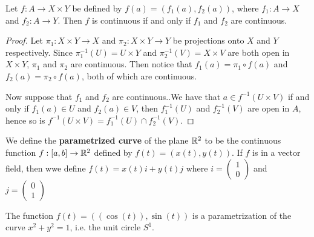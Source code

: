 \begin{theorem}\label{1.7.5}
    Let $f:A \rightarrow X \times Y$ be defined by  $f(a)=(f_1(a),f_2(a))$, where $ f_1:A
    \rightarrow X$ and $ f_2: A \rightarrow Y$. Then $f$ is continuous if and only if  $ f_1$ and $
    f_2$ are continuous.
\end{theorem}
\begin{proof}
    Let $\pi_1:X \times Y \rightarrow X$ and $\pi_2:X \times Y \rightarrow Y$ be projections onto
    $X$ and  $Y$ respectively. Since  $\pi_1^{-1}(U)=U \times Y$ and $\pi_2^{-1}(V)=X \times V$ are
    both open in  $X \times Y$,  $\pi_1$ and $\pi_2$ are continuous. Then notice that $ f_1(a)=\pi_1
    \circ f(a)$ and $ f_2(a)=\pi_2 \circ f(a)$, both of which are continuous.

    Now suppose that $ f_1$ and $ f_2$ are continuous..We have that $a \in f^{-1}(U \times V)$ if
    and only if $f_1(a) \in U$ and $ f_2(a) \in V$, then $ f_1^{-1}(U)$ and $f_2^{-1}(V)$ are open
    in $A$, hence so is $f^{-1}(U \times V)=f_1^{-1}(U) \cap f_2^{-1}(V)$.
\end{proof}

\begin{definition}
    We define the \textbf{parametrized curve} of the plane $\mathbb{R}^2$ to be the continuous function
    $f:[a,b] \rightarrow \mathbb{R}^2$ defined by $f(t)=(x(t),y(t))$. If $f$ is in a vector field, then wwe
    define $f(t)=x(t)i+y(t)j$ where $i=
    \begin{pmatrix}
        1 \\
        0
    \end{pmatrix}$
    and $j=
    \begin{pmatrix}
        0 \\
        1
    \end{pmatrix}$
\end{definition}

\begin{example}
    The function $f(t)=((\cos(t)),\sin(t))$ is a parametrization of the curve $x^2+y^2=1$, i.e. the
    unit circle  $S^1$.
\end{example} 
